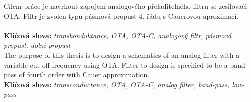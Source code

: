 \noindent Cílem práce je navrhout zapojení analogového přeladitelného filtru se zesilovači OTA. Filtr je zvolen typu pásmová propust 4. řádu s Cauerovou aproximací.\\
\\
\noindent \textbf{Klíčová slova:} \textit{transkonduktance, OTA, OTA-C, analogový filtr, pásmová propust, dolní propust}\\

\noindent The purpose of this thesis is to design a schematics of an analog filter with a variable cut-off frequency using OTA. Filter to design is specified to be a band-pass of fourth order with Cauer approximation. \\

\noindent \textbf{Klíčová slova:} \textit{transconductance, OTA, OTA-C, analog filter, band-pass, low-pass} \\